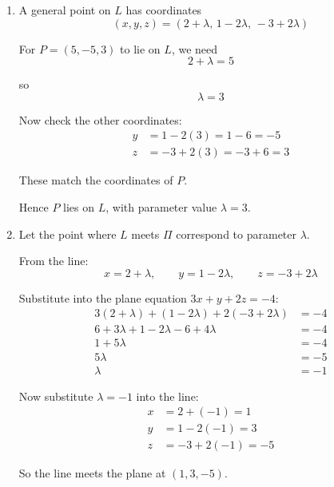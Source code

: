\documentclass[leqno]{article}
\begin{document}
\begin{enumerate}[
  label=\textbf{\arabic*.},
  leftmargin=*,
  topsep=0pt,
  partopsep=0pt,
  parsep=0pt
]
\begin{djsSolution}
\begin{enumerate}[label=\textbf{(\alph*)}]
so $a=3$, $b=1$, $c=2$, $d=-4$, and $P=(5,-5,3)$.

Substituting into the formula:
\begin{align*}
\mathrm{dist}
&=\frac{\left\lvert 3(5)+1(-5)+2(3)-(-4)\right\rvert}{\sqrt{3^2+1^2+2^2}}\\
&=\frac{\left\lvert 15-5+6+4\right\rvert}{\sqrt{9+1+4}}\\
&=\frac{20}{\sqrt{14}}\\
&=\frac{10\sqrt{14}}{7}
\end{align*}

So the shortest distance from $P$ to $\Pi$ is $\frac{20}{\sqrt{14}}=\frac{10\sqrt{14}}{7}$.

  \item A general point on $L$ has coordinates
\[
(x,y,z)=(2+\lambda,\,1-2\lambda,\,-3+2\lambda)
\]

For $P=(5,-5,3)$ to lie on $L$, we need
\[
2+\lambda=5
\]

so
\[
\lambda=3
\]

Now check the other coordinates:
\begin{align*}
y&=1-2(3)=1-6=-5\\
z&=-3+2(3)=-3+6=3
\end{align*}

These match the coordinates of $P$.

Hence $P$ lies on $L$, with parameter value $\lambda=3$.

  \item Let the point where $L$ meets $\Pi$ correspond to parameter $\lambda$.

From the line:
\[
x=2+\lambda,\qquad y=1-2\lambda,\qquad z=-3+2\lambda
\]

Substitute into the plane equation $3x+y+2z=-4$:
\begin{align*}
3(2+\lambda)+(1-2\lambda)+2(-3+2\lambda)&=-4\\
6+3\lambda+1-2\lambda-6+4\lambda&=-4\\
1+5\lambda&=-4\\
5\lambda&=-5\\
\lambda&=-1
\end{align*}

Now substitute $\lambda=-1$ into the line:
\begin{align*}
x&=2+(-1)=1\\
y&=1-2(-1)=3\\
z&=-3+2(-1)=-5
\end{align*}

So the line meets the plane at $(1,3,-5)$.


\end{enumerate}
\end{djsSolution}
\end{enumerate}
\end{document}
